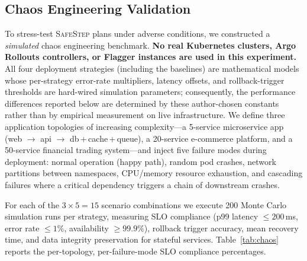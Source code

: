 \documentclass[10pt,twocolumn]{article}
\newcommand{\safestep}{\textsc{SafeStep}}
\begin{document}
\subsection{Chaos Engineering Validation}
\label{sec:chaos-validation}

To stress-test \safestep{} plans under adverse conditions,
we constructed a \emph{simulated} chaos engineering benchmark.
\textbf{No real Kubernetes clusters, Argo Rollouts controllers,
or Flagger instances are used in this experiment.}  All four
deployment strategies (including the baselines) are
mathematical models whose per-strategy error-rate multipliers,
latency offsets, and rollback-trigger thresholds are
hard-wired simulation parameters; consequently, the
performance differences reported below are determined by these
author-chosen constants rather than by empirical measurement on
live infrastructure.
We define three application topologies of increasing
complexity---a 5-service microservice app (web $\to$ api $\to$
db\,+\,cache\,+\,queue), a 20-service e-commerce platform, and a
50-service financial trading system---and inject five failure
modes during deployment: normal operation (happy path), random
pod crashes, network partitions between namespaces, CPU/memory
resource exhaustion, and cascading failures where a critical
dependency triggers a chain of downstream crashes.

For each of the $3 \times 5 = 15$ scenario combinations we
execute 200 Monte Carlo simulation runs per strategy, measuring
SLO compliance (p99 latency $\leq 200$\,ms, error rate
$\leq 1\%$, availability $\geq 99.9\%$), rollback trigger
accuracy, mean recovery time, and data integrity preservation
for stateful services. Table~\ref{tab:chaos} reports the
per-topology, per-failure-mode SLO compliance percentages.
\end{document}
